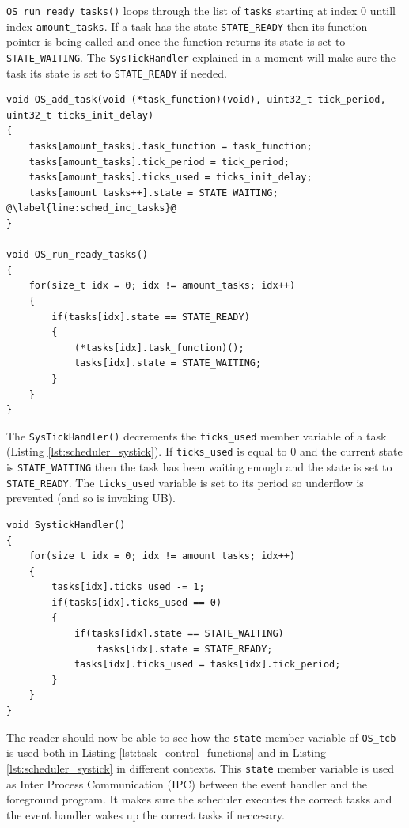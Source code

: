 \texttt{OS\_run\_ready\_tasks()} loops through the list of \texttt{tasks} starting at index 0 untill index \texttt{amount\_tasks}.
If a task has the state \texttt{STATE\_READY} then its function pointer is being called and once the function returns its state is set to \texttt{STATE\_WAITING}.
The \texttt{SysTickHandler} explained in a moment will make sure the task its state is set to \texttt{STATE\_READY} if needed.
\begin{lstlisting}[style=CStyle, caption={Task controllers}, captionpos=b, label={lst:task_control_functions}, escapechar=@]
void OS_add_task(void (*task_function)(void), uint32_t tick_period, uint32_t ticks_init_delay)
{
    tasks[amount_tasks].task_function = task_function;
    tasks[amount_tasks].tick_period = tick_period;
    tasks[amount_tasks].ticks_used = ticks_init_delay;
    tasks[amount_tasks++].state = STATE_WAITING;        @\label{line:sched_inc_tasks}@
}

void OS_run_ready_tasks()
{
    for(size_t idx = 0; idx != amount_tasks; idx++)
    {
        if(tasks[idx].state == STATE_READY)
        {
            (*tasks[idx].task_function)();
            tasks[idx].state = STATE_WAITING;
        }
    }
}
\end{lstlisting}

The \texttt{SysTickHandler()} decrements the \texttt{ticks\_used} member variable of a task (Listing \ref{lst:scheduler_systick}).
If \texttt{ticks\_used} is equal to 0 and the current state is \texttt{STATE\_WAITING} then the task has been waiting enough and the state is set to \texttt{STATE\_READY}.
The \texttt{ticks\_used} variable is set to its period so underflow is prevented (and so is invoking UB).

\begin{lstlisting}[style=CStyle, caption={Scheduler SysTick}, captionpos=b, label={lst:scheduler_systick}, escapechar=@]
void SystickHandler()
{
    for(size_t idx = 0; idx != amount_tasks; idx++)
    {
        tasks[idx].ticks_used -= 1;
        if(tasks[idx].ticks_used == 0)
        {
            if(tasks[idx].state == STATE_WAITING)
                tasks[idx].state = STATE_READY;
            tasks[idx].ticks_used = tasks[idx].tick_period;
        }
    }
}
\end{lstlisting}

The reader should now be able to see how the \texttt{state} member variable of \texttt{OS\_tcb} is used both in Listing \ref{lst:task_control_functions} and in Listing \ref{lst:scheduler_systick} in different contexts.
This \texttt{state} member variable is used as Inter Process Communication (IPC) between the event handler and the foreground program.
It makes sure the scheduler executes the correct tasks and the event handler wakes up the correct tasks if neccesary.

